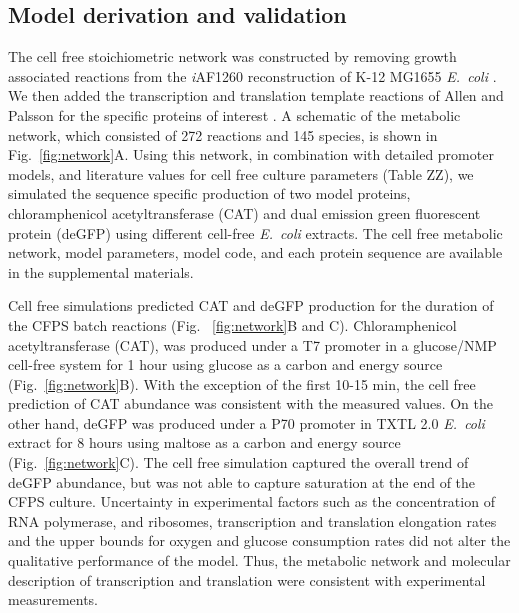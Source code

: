 \documentclass[journal=asbcd6,manuscript=article]{achemso}
\begin{document}
\subsection{Model derivation and validation}
The cell free stoichiometric network was constructed by removing growth associated reactions from the \textit{i}AF1260 reconstruction of K-12 MG1655 \textit{E.~coli} \cite{Feist:2007aa}.
We then added the transcription and translation template reactions of Allen and Palsson for the specific proteins of interest \cite{Allen:2003aa}.
A schematic of the metabolic network, which consisted of 272 reactions and 145 species, is shown in Fig.~\ref{fig:network}A.
Using this network, in combination with detailed promoter models, and literature values for cell free culture parameters (Table ZZ),
we simulated the sequence specific production of two model proteins, chloramphenicol acetyltransferase (CAT) and dual emission green fluorescent protein (deGFP) using
different cell-free \textit{E.~coli} extracts. The cell free metabolic network, model parameters, model code,
and each protein sequence are available in the supplemental materials.

Cell free simulations predicted CAT and deGFP production for the duration of the CFPS batch reactions (Fig. ~\ref{fig:network}B and C).
Chloramphenicol acetyltransferase (CAT), was produced under a T7 promoter in a glucose/NMP cell-free system \cite{2005_calhoun_BiotechnologyProgress} for 1 hour using glucose as a carbon and energy source (Fig.~\ref{fig:network}B).
With the exception of the first 10-15 min, the cell free prediction of CAT abundance was consistent with the measured values.
On the other hand, deGFP was produced under a P70 promoter in TXTL 2.0 \textit{E.~coli} extract for 8 hours using maltose as a carbon and energy source (Fig.~\ref{fig:network}C).
The cell free simulation captured the overall trend of deGFP abundance, but was not able to capture saturation at the end of the CFPS culture.
Uncertainty in experimental factors such as the concentration of RNA polymerase, and ribosomes,
transcription and translation elongation rates and the upper bounds for oxygen and glucose consumption rates did not alter the qualitative performance of the model.
Thus, the metabolic network and molecular description of transcription and translation were consistent with experimental measurements.
\end{document}
